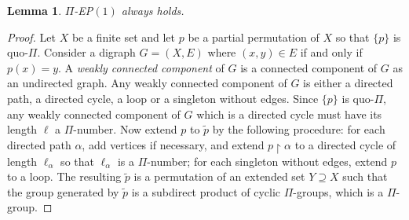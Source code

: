 \documentclass[11pt]{amsart}
\newtheorem{lemma}[theorem]{Lemma}
\theoremstyle{definition}
\theoremstyle{definition}
\numberwithin{equation}{section}
\begin{document}
\begin{lemma} $\Pi$-{\rm EP}$(1)$ always holds.
\end{lemma}

\begin{proof} Let $X$ be a finite set and let $p$ be a partial permutation of $X$ so that $\{p\}$ is quo-$\Pi$. Consider a digraph $G=(X, E)$ where $(x,y)\in E$ if and only if $p(x)=y$. A {\em weakly connected component} of $G$ is a connected component of $G$ as an undirected graph. Any weakly connected component of $G$ is either a directed path, a directed cycle, a loop or a singleton without edges. Since $\{p\}$ is quo-$\Pi$, any weakly connected component of $G$ which is a directed cycle must have its length $\ell$ a $\Pi$-number. Now extend $p$ to $\tilde{p}$ by the following procedure: for each directed path $\alpha$, add vertices if necessary, and extend $p\upharpoonright \alpha$ to a directed cycle of length $\ell_\alpha$ so that $\ell_\alpha$ is a $\Pi$-number; for each singleton without edges, extend $p$ to a loop. The resulting $\tilde{p}$ is a permutation of an extended set $Y\supseteq X$ such that the group generated by $\tilde{p}$ is a subdirect product of cyclic $\Pi$-groups, which is a $\Pi$-group. 
\end{proof}
\end{document}
